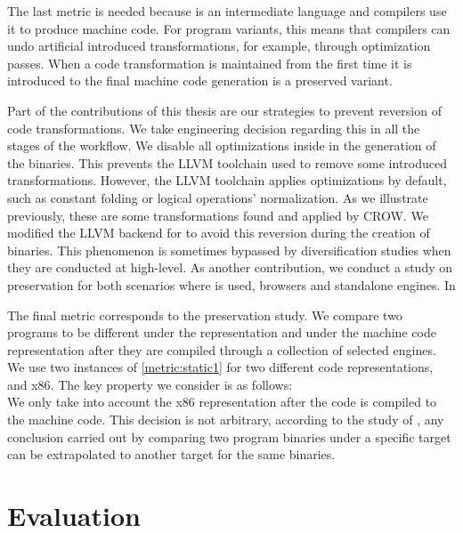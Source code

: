 The last metric is needed because \wasm is an intermediate language and compilers use it to produce machine code. For program variants, this means that compilers can undo artificial introduced transformations, for example, through optimization passes. When a code transformation is maintained from the first time it is introduced to the final machine code generation is  a preserved variant. 

Part of the contributions of this thesis are our strategies to prevent reversion of code transformations. We take engineering decision regarding this in all the stages of the workflow. We disable all optimizations inside in the generation of the \wasm binaries. This prevents the LLVM toolchain used to remove some introduced transformations. However, the LLVM toolchain applies optimizations by default, such as constant folding or logical operations' normalization. As we illustrate previously, these are some transformations found and applied by CROW. We modified the LLVM backend for \wasm to avoid this reversion during the creation of binaries.
This phenomenon is sometimes bypassed by diversification studies when they are conducted at high-level. As another contribution, we conduct a study on preservation for both scenarios where is used, browsers and standalone engines. In

The final metric corresponds to the preservation study. We compare two programs to be different under the \wasm representation and under the machine code representation after they are compiled through a collection of selected \wasm engines. We use two instances of \autoref{metric:static1} for two different code representations, \wasm and x86. The key property we consider is as follows: \\


We only take into account the x86 representation after the \wasm code is compiled to the machine code. 
This decision is not arbitrary, according to the study of , any conclusion carried out by comparing two program binaries under a specific target can be extrapolated to another target for the same binaries.


\section{Evaluation}

